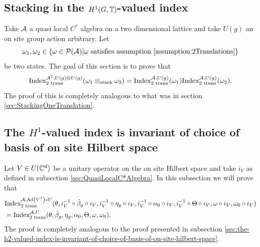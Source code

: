 \documentclass[12pt,a4paper,twoside]{article}
\numberwithin{equation}{section}
\begin{document}
\subsection{Stacking in the $H^1(G,\TT)$-valued index}\label{sec:StackingTwoTranslations}
Take $\AA$ a quasi local $C^*$ algebra on a two dimensional lattice and take $U(g)$ an on site group action arbitrary. Let
\begin{equation}
	\omega_1,\omega_2\in\{\omega\in\PP(\AA)| \omega\text{ satisfies assumption \ref{assumption:2Translations}}\}
\end{equation}
be two states. The goal of this section is to prove that
\begin{equation}\label{eq:IndexMorphismUnderStackingTwoTranslations}
	\textrm{Index}^{\AA^2,U(g)\otimes U(g)}_{\text{2 trans}}(\omega_1\otimes_{\text{stack}}\omega_2)=\textrm{Index}^{\AA,U(g)}_{\text{2 trans}}(\omega_1)\textrm{Index}^{\AA,U(g)}_{\text{2 trans}}(\omega_2).
\end{equation}
The proof of this is completely analogous to what was in section \ref{sec:StackingOneTranslation}.
\subsection{The $H^1$-valued index is invariant of choice of basis of on site Hilbert space}\label{sec:the-h2-valued-index-is-invariant-of-choice-of-basis-of-on-site-hilbert-space-TwoTranslations}
Let $V \in U(\CC^d)$ be a unitary operator on the on site Hilbert space and take $i_V$ as defined in subsection \ref{sec:QuasiLocalC*Algebra}. In this subsection we will prove that
\begin{align}
	&\textrm{Index}^{\AA,\Ad{V^\dagger}\circ U}_{2\text{ trans}}(\theta,i_V^{-1}\circ\tilde{\beta}_g\circ i_V,i_V^{-1}\circ\eta_g\circ i_V,i_V^{-1}\circ\alpha_0\circ i_V,i_V^{-1}\circ\Theta\circ i_V,\omega\circ i_V,\omega_0\circ i_V)\\
	&=\textrm{Index}^{\AA,U}_{2\text{ trans}}(\theta,\tilde{\beta}_g,\eta_g,\alpha_0,\Theta,\omega,\omega_0).
\end{align}
The proof is completely analogous to the proof presented in subsection \ref{sec:the-h2-valued-index-is-invariant-of-choice-of-basis-of-on-site-hilbert-space}.
\end{document}
